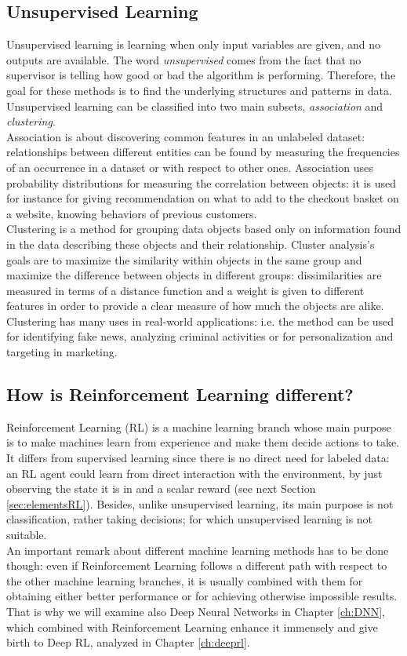 \subsection{Unsupervised Learning}
Unsupervised learning is learning when only input variables are given, and no outputs are available. The word \textit{unsupervised} comes from the fact that no supervisor is telling how good or bad the algorithm is performing. Therefore, the goal for these methods is to find the underlying structures and patterns in data. Unsupervised learning can be classified into two main subsets, \textit{association} and \textit{clustering}.
\\
\indent Association is about discovering common features in an unlabeled dataset: relationships between different entities can be found by measuring the frequencies of an occurrence in a dataset or with respect to other ones. Association uses probability distributions for measuring the correlation between objects: it is used for instance for giving recommendation on what to add to the checkout basket on a website, knowing behaviors of previous customers.
\\
\indent Clustering is a method for grouping data objects based only on information found in the data describing these objects and their relationship. Cluster analysis's goals are to maximize the similarity within objects in the same group and maximize the difference between objects in different groups: dissimilarities are measured in terms of a distance function and a weight is given to different features in order to provide a clear measure of how much the objects are alike. Clustering has many uses in real-world applications: i.e. the method can be used for identifying fake news, analyzing criminal activities or for personalization and targeting in marketing. 

\subsection{How is Reinforcement Learning different?}

Reinforcement Learning (RL) is a machine learning branch whose main purpose is to make machines learn from experience and make them decide actions to take. It differs from supervised learning since there is no direct need for labeled data: an RL agent could learn from direct interaction with the environment, by just observing the state it is in and a scalar reward (see next Section \ref{sec:elementsRL}). Besides, unlike unsupervised learning, its main purpose is not classification, rather taking decisions; for which unsupervised learning is not suitable.
\\
\indent An important remark about different machine learning methods has to be done though: even if Reinforcement Learning follows a different path with respect to the other machine learning branches, it is usually combined with them for obtaining either better performance or for achieving otherwise impossible results. That is why we will examine also Deep Neural Networks in Chapter \ref{ch:DNN}, which combined with Reinforcement Learning enhance it immensely and give birth to Deep RL, analyzed in Chapter \ref{ch:deeprl}.


